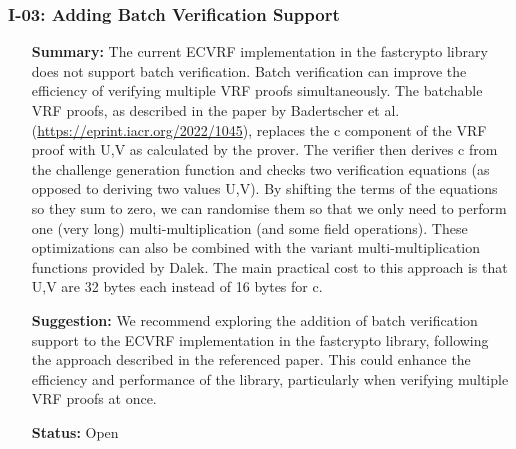 \subsubsection*{I-03: Adding Batch Verification Support}
\begin{itemize}[align=left]
    \item[\textbf{Summary:}] The current ECVRF implementation in the fastcrypto library does not support batch verification. Batch verification can improve the efficiency of verifying multiple VRF proofs simultaneously. The batchable VRF proofs, as described in the paper by Badertscher et al.\cite{batch-ecvrf} (\href{https://eprint.iacr.org/2022/1045}{https://eprint.iacr.org/2022/1045}), replaces the c component of the VRF proof with U,V as calculated by the prover. The verifier then derives c from the challenge generation function and checks two verification equations (as opposed to deriving two values U,V). By shifting the terms of the equations so they sum to zero, we can randomise them so that we only need to perform one (very long) multi-multiplication (and some field operations). These optimizations can also be combined with the variant multi-multiplication functions provided by Dalek. The main practical cost to this approach is that U,V are 32 bytes each instead of 16 bytes for c.
    \item[\textbf{Suggestion:}] We recommend exploring the addition of batch verification support to the ECVRF implementation in the fastcrypto library, following the approach described in the referenced paper. This could enhance the efficiency and performance of the library, particularly when verifying multiple VRF proofs at once.
    \item[\textbf{Status:}] Open
\end{itemize}
